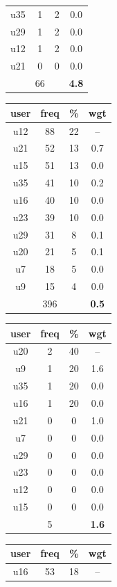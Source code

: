 \begin{table}
\begin{tabular}{ |c|c|c|c| }
	u35 & 1 & 2 & 0.0 \\
	u29 & 1 & 2 & 0.0 \\
	u12 & 1 & 2 & 0.0 \\
	u21 & 0 & 0 & 0.0 \\
	 & 66 & & \textbf{4.8} \\
	\hline
\end{tabular}
\begin{tabular}{ |c|c|c|c| }
	\hline
	\textbf{user} & \textbf{freq} & \textbf{\%} & \textbf{wgt} \\
	\hline
	u12 & 88 & 22 & -- \\
	u21 & 52 & 13 & 0.7 \\
	u15 & 51 & 13 & 0.0 \\
	u35 & 41 & 10 & 0.2 \\
	u16 & 40 & 10 & 0.0 \\
	u23 & 39 & 10 & 0.0 \\
	u29 & 31 & 8 & 0.1 \\
	u20 & 21 & 5 & 0.1 \\
	u7 & 18 & 5 & 0.0 \\
	u9 & 15 & 4 & 0.0 \\
	 & 396 & & \textbf{0.5} \\
	\hline
\end{tabular}
\begin{tabular}{ |c|c|c|c| }
	\hline
	\textbf{user} & \textbf{freq} & \textbf{\%} & \textbf{wgt} \\
	\hline
	u20 & 2 & 40 & -- \\
	u9 & 1 & 20 & 1.6 \\
	u35 & 1 & 20 & 0.0 \\
	u16 & 1 & 20 & 0.0 \\
	u21 & 0 & 0 & 1.0 \\
	u7 & 0 & 0 & 0.0 \\
	u29 & 0 & 0 & 0.0 \\
	u23 & 0 & 0 & 0.0 \\
	u12 & 0 & 0 & 0.0 \\
	u15 & 0 & 0 & 0.0 \\
	 & 5 & & \textbf{1.6} \\
	\hline
\end{tabular}
\begin{tabular}{ |c|c|c|c| }
	\hline
	\textbf{user} & \textbf{freq} & \textbf{\%} & \textbf{wgt} \\
	\hline
	u16 & 53 & 18 & -- \\

\end{tabular}
\end{table}
